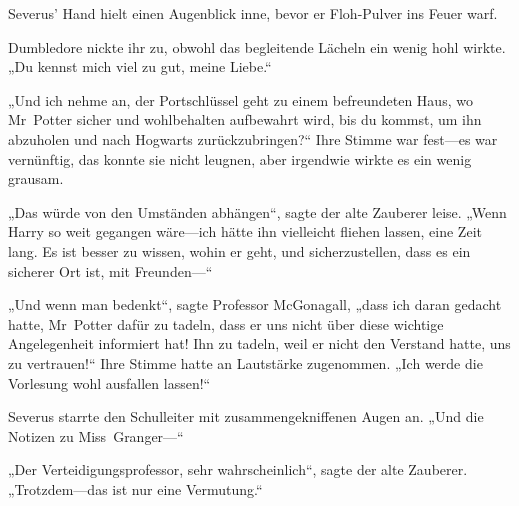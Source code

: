 Severus’ Hand hielt einen Augenblick inne, bevor er Floh-Pulver ins Feuer warf.

Dumbledore nickte ihr zu, obwohl das begleitende Lächeln ein wenig hohl wirkte. „Du kennst mich viel zu gut, meine Liebe.“

„Und ich nehme an, der Portschlüssel geht zu einem befreundeten Haus, wo Mr~Potter sicher und wohlbehalten aufbewahrt wird, bis du kommst, um ihn abzuholen und nach Hogwarts zurückzubringen?“
Ihre Stimme war fest—es war vernünftig, das konnte sie nicht leugnen, aber irgendwie wirkte es ein wenig grausam.

„Das würde von den Umständen abhängen“, sagte der alte Zauberer leise. „Wenn Harry so weit gegangen wäre—ich hätte ihn vielleicht fliehen lassen, eine Zeit lang. Es ist besser zu wissen, wohin er geht, und sicherzustellen, dass es ein sicherer Ort ist, mit Freunden—“

„Und wenn man bedenkt“, sagte Professor McGonagall, „dass ich daran gedacht hatte, Mr~Potter dafür zu tadeln, dass er uns nicht über diese wichtige Angelegenheit informiert hat! Ihn zu tadeln, weil er nicht den Verstand hatte, uns zu vertrauen!“
Ihre Stimme hatte an Lautstärke zugenommen.
„Ich werde die Vorlesung wohl ausfallen lassen!“

Severus starrte den Schulleiter mit zusammengekniffenen Augen an. „Und die Notizen zu Miss~Granger—“

„Der Verteidigungsprofessor, sehr wahrscheinlich“, sagte der alte Zauberer. „Trotzdem—das ist nur eine Vermutung.“

